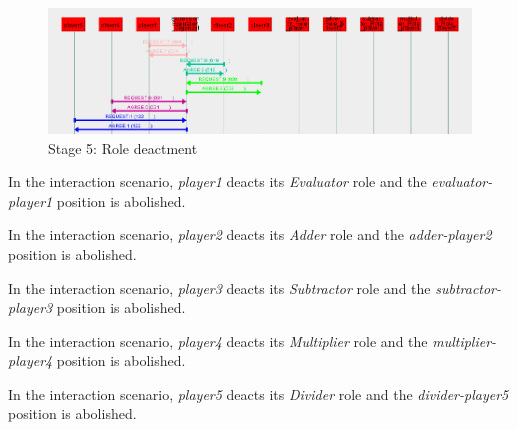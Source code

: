 \begin{figure}[H]
	\centering
	\includegraphics[width=\textwidth]{images/examples/example2-stage5.png}
	\caption{Stage 5: Role deactment}
	\label{figure:example2-stage5}
\end{figure} 

In the {} interaction scenario, \textit{player1} deacts its \textit{Evaluator} role and the \textit{evaluator-player1} position is abolished.

In the {} interaction scenario, \textit{player2} deacts its \textit{Adder} role and the \textit{adder-player2} position is abolished.

In the {} interaction scenario, \textit{player3} deacts its \textit{Subtractor} role and the \textit{subtractor-player3} position is abolished.

In the {} interaction scenario, \textit{player4} deacts its \textit{Multiplier} role and the \textit{multiplier-player4} position is abolished.

In the {} interaction scenario, \textit{player5} deacts its \textit{Divider} role and the \textit{divider-player5} position is abolished.